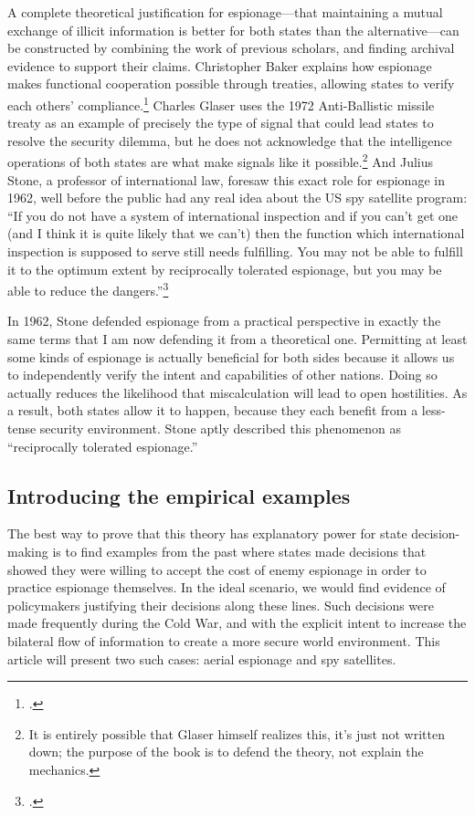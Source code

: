 \documentclass[14pt]{extarticle}
\begin{document}
A complete theoretical justification for espionage---that maintaining a mutual exchange of illicit information is better for both states than the alternative---can be constructed by combining the work of previous scholars, and finding archival evidence to support their claims. Christopher Baker explains how espionage makes functional cooperation possible through treaties, allowing states to verify each others' compliance.\footcite[p.~6]{baker_tolerance_2004} Charles Glaser uses the 1972 Anti-Ballistic missile treaty as an example of precisely the type of signal that could lead states to resolve the security dilemma, but he does not acknowledge that the intelligence operations of both states are what make signals like it possible.\footnote{It is entirely possible that Glaser himself realizes this, it's just not written down; the purpose of the book is to defend the theory, not explain the mechanics.} And Julius Stone, a professor of international law, foresaw this exact role for espionage in 1962, well before the public had any real idea about the US spy satellite program: \enquote{If you do not have a system of international inspection and if you can't get one (and I think it is quite likely that we can't) then the function which international inspection is supposed to serve still needs fulfilling. You may not be able to fulfill it to the optimum extent by reciprocally tolerated espionage, but you may be able to reduce the dangers.}\footcite[p.~41]{stone_legal_1962}

In 1962, Stone defended espionage from a practical perspective in exactly the same terms that I am now defending it from a theoretical one. Permitting at least some kinds of espionage is actually beneficial for both sides because it allows us to independently verify the intent and capabilities of other nations. Doing so actually reduces the likelihood that miscalculation will lead to open hostilities. As a result, both states allow it to happen, because they each benefit from a less-tense security environment. Stone aptly described this phenomenon as \enquote{reciprocally tolerated espionage.}

\subsection{Introducing the empirical examples}

The best way to prove that this theory has explanatory power for state decision-making is to find examples from the past where states made decisions that showed they were willing to accept the cost of enemy espionage in order to practice espionage themselves. In the ideal scenario, we would find evidence of policymakers justifying their decisions along these lines. Such decisions were made frequently during the Cold War, and with the explicit intent to increase the bilateral flow of information to create a more secure world environment. This article will present two such cases: aerial espionage and spy satellites.
\end{document}
